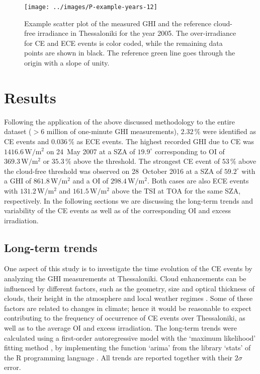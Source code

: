 \documentclass[preprint, 5p,
authoryear]{elsarticle} %
\begin{document}
\begin{figure}[H]

{\centering \texttt{[image: ../images/P-example-years-12]} 

}

\caption{Example scatter plot of the measured GHI and the reference cloud-free irradiance in Thessaloniki for the year 2005. The over-irradiance for CE and ECE events is color coded, while the remaining data points are shown in black. The reference green line goes through the origin with a slope of unity.}\label{fig:example-year}
\end{figure}

\hypertarget{results}{%
\section{Results}\label{results}}

Following the application of the above discussed methodology to the
entire dataset (\(>6\) million of one-minute GHI measurements),
\(2.32\,\%\) were identified as CE events and \(0.036\,\%\) as ECE
events. The highest recorded GHI due to CE was
\(1416.6\,\text{W}/\text{m}^2\) on 24~May 2007 at a SZA of
\(19.9^\circ\) corresponding to OI of \(369.3\,\text{W}/\text{m}^2\) or
\(35.3\,\%\) above the threshold. The strongest CE event of \(53\,\%\)
above the cloud-free threshold was observed on 28~October 2016 at a SZA
of \(59.2^\circ\) with a GHI of \(861.8\,\text{W}/\text{m}^2\) and a OI
of \(298.4\,\text{W}/\text{m}^2\). Both cases are also ECE events with
\(131.2\,\text{W}/\text{m}^2\) and \(161.5\,\text{W}/\text{m}^2\) above
the TSI at TOA for the same SZA, respectively. In the following sections
we are discussing the long-term trends and variability of the CE events
as well as of the corresponding OI and excess irradiation.

\hypertarget{long-term-trends}{%
\subsection{Long-term trends}\label{long-term-trends}}

One aspect of this study is to investigate the time evolution of the CE
events by analyzing the GHI measurements at Thessaloniki. Cloud
enhancements can be influenced by different factors, such as the
geometry, size and optical thickness of clouds, their height in the
atmosphere and local weather regimes
\citep{Mol2023, Veerman2022, Gristey2022, Tzoumanikas2016}. Some of
these factors are related to changes in climate; hence it would be
reasonable to expect contributing to the frequency of occurrence of CE
events over Thessaloniki, as well as to the average OI and excess
irradiation. The long-term trends were calculated using a first-order
autoregressive model with the `maximum likelihood' fitting method
\citep{Gardner1980, Jones1980}, by implementing the function `arima'
from the library `stats' of the R programming language \citep{RCT2023}.
All trends are reported together with their \(2\sigma\) error.
\end{document}
